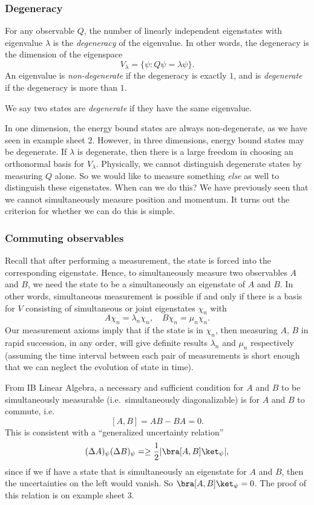 \documentclass[a4paper]{article}
\begin{document}
\subsubsection*{Degeneracy}
\begin{defi}[Degeneracy]
  For any observable $Q$, the number of linearly independent eigenstates with eigenvalue $\lambda$ is the \emph{degeneracy} of the eigenvalue. In other words, the degeneracy is the dimension of the eigenspace
  \[
    V_\lambda = \{\psi: Q \psi = \lambda \psi\}.
  \]
  An eigenvalue is \emph{non-degenerate} if the degeneracy is exactly $1$, and is \emph{degenerate} if the degeneracy is more than $1$.

  We say two states are \emph{degenerate} if they have the same eigenvalue.
\end{defi}
In one dimension, the energy bound states are always non-degenerate, as we have seen in example sheet 2. However, in three dimensions, energy bound states may be degenerate. If $\lambda$ is degenerate, then there is a large freedom in choosing an orthonormal basis for $V_\lambda$. Physically, we cannot distinguish degenerate states by measuring $Q$ alone. So we would like to measure something \emph{else} as well to distinguish these eigenstates. When can we do this? We have previously seen that we cannot simultaneously measure position and momentum. It turns out the criterion for whether we can do this is simple.

\subsubsection*{Commuting observables}
Recall that after performing a measurement, the state is forced into the corresponding eigenstate. Hence, to simultaneously measure two observables $A$ and $B$, we need the state to be a simultaneously an eigenstate of $A$ and $B$. In other words, simultaneous measurement is possible if and only if there is a basis for $V$ consisting of simultaneous or joint eigenstates $\chi_n$ with
\[
  A \chi_n = \lambda_n \chi_n,\quad B \chi_n = \mu_n \chi_n.
\]
Our measurement axioms imply that if the state is in $\chi_n$, then measuring $A$, $B$ in rapid succession, in any order, will give definite results $\lambda_n$ and $\mu_n$ respectively (assuming the time interval between each pair of measurements is short enough that we can neglect the evolution of state in time).

From IB Linear Algebra, a necessary and sufficient condition for $A$ and $B$ to be simultaneously measurable (i.e.\ simultaneously diagonalizable) is for $A$ and $B$ to commute, i.e.
\[
  [A, B] = AB - BA = 0.
\]
This is consistent with a ``generalized uncertainty relation''
\[
  (\Delta A)_\psi (\Delta B)_\psi =\geq \frac{1}{2} |\bra [A, B]\ket_\psi|,
\]
since if we if have a state that is simultaneously an eigenstate for $A$ and $B$, then the uncertainties on the left would vanish. So $\bra [A, B]\ket_\psi = 0$. The proof of this relation is on example sheet 3.
\end{document}
